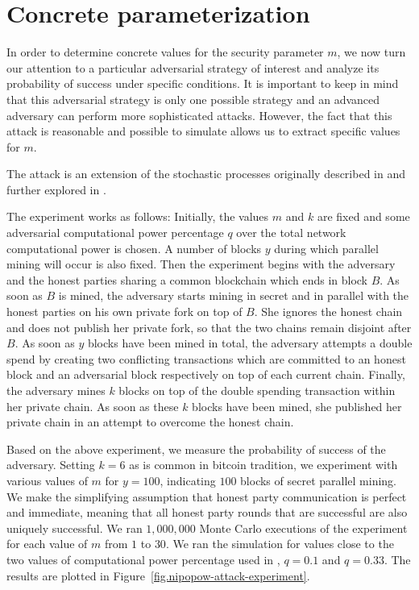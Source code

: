 \section{Concrete parameterization}

In order to determine concrete values for the security parameter $m$, we now
turn our attention to a particular adversarial strategy of interest and analyze
its probability of success under specific conditions. It is important to keep
in mind that this adversarial strategy is only one possible strategy and an
advanced adversary can perform more sophisticated attacks. However, the fact
that this attack is reasonable and possible to simulate allows us to extract
specific values for $m$.

The attack is an extension of the stochastic processes originally described in
\cite{bitcoin} and further explored in \cite{rosenfeld}.

The experiment works as follows: Initially, the values $m$ and $k$ are fixed
and some adversarial computational power percentage $q$ over the total network
computational power is chosen. A number of blocks $y$ during which parallel
mining will occur is also fixed. Then the experiment begins with the adversary
and the honest parties sharing a common blockchain which ends in block $B$. As
soon as $B$ is mined, the adversary starts mining in secret and in parallel
with the honest parties on his own private fork on top of $B$. She ignores the
honest chain and does not publish her private fork, so that the two chains
remain disjoint after $B$. As soon as $y$ blocks have been mined in total, the
adversary attempts a double spend by creating two conflicting transactions
which are committed to an honest block and an adversarial block respectively on
top of each current chain. Finally, the adversary mines $k$ blocks on top of
the double spending transaction within her private chain. As soon as these $k$
blocks have been mined, she published her private chain in an attempt to
overcome the honest chain.

Based on the above experiment, we measure the probability of success of the
adversary. Setting $k = 6$ as is common in bitcoin tradition, we experiment
with various values of $m$ for $y = 100$, indicating $100$ blocks of secret
parallel mining. We make the simplifying assumption that honest party
communication is perfect and immediate, meaning that all honest party rounds
that are successful are also uniquely successful. We ran $1,000,000$ Monte
Carlo executions of the experiment for each value of $m$ from $1$ to $30$. We
ran the simulation for values close to the two values of computational power
percentage used in \cite{bitcoin}, $q = 0.1$ and $q = 0.33$. The results are
plotted in Figure~\ref{fig.nipopow-attack-experiment}.


